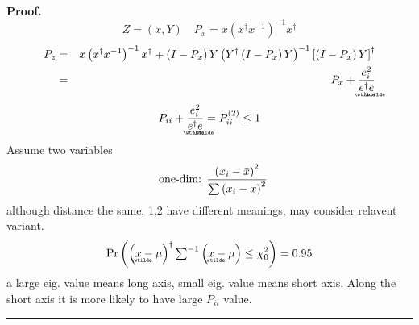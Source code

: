 \documentclass{article}
\newenvironment{proof}[1][Proof]{\noindent\textbf{#1.} }{\ \rule{0.5em}{0.5em}}
\begin{document}
\begin{itemize}
\begin{enumerate}
\begin{proof}
\begin{equation*}
Z=\left( x,Y\right) \quad P_{x}=x\left( x^{\dagger }x^{-1}\right)
^{-1}x^{\dagger }
\end{equation*}%
\begin{eqnarray*}
P_{z} &=&x\left( x^{\dagger }x^{-1}\right) ^{-1}x^{\dagger }+\left(
I-P_{x}\right) Y\left( Y^{\dagger }\left( I-P_{x}\right) Y\right) ^{-1}\left[
\left( I-P_{x}\right) Y\right] ^{\dagger } \\
&=&P_{x}+\frac{e_{i}^{2}}{%
\underaccent{\wtilde}{e}%
^{\dagger }%
\underaccent{\wtilde}{e}%
}
\end{eqnarray*}%
\begin{equation*}
P_{ii}+\frac{e_{i}^{2}}{%
\underaccent{\wtilde}{e}%
^{\dagger }%
\underaccent{\wtilde}{e}%
}=P_{ii}^{\left( 2\right) }\leq 1
\end{equation*}%
Assume two variables%
\begin{equation*}
\text{one-dim: }\frac{\left( x_{i}-\bar{x}\right) ^{2}}{\tsum \left( x_{i}-%
\bar{x}\right) ^{2}}
\end{equation*}%
although distance the same, 1,2 have different meanings, may consider
relavent variant.%
\begin{equation*}
\Pr \left( \left( 
\underaccent{\wtilde}{x}%
-\mu \right) ^{\dagger }\tsum\nolimits^{-1}\left( 
\underaccent{\wtilde}{x}%
-\mu \right) \leq \chi _{0}^{2}\right) =0.95
\end{equation*}%
a large eig. value means long axis, small eig. value means short axis. Along
the short axis it is more likely to have large $P_{ii}$ value.
\end{proof}
\end{enumerate}
\end{itemize}

\bigskip
\end{document}
